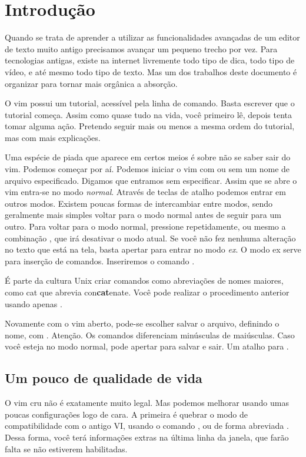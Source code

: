 \section{Introdução}
Quando se trata de aprender a utilizar as funcionalidades avançadas de um editor de texto muito
antigo precisamos avançar um pequeno trecho por vez.
Para tecnologias antigas, existe na internet livremente todo tipo de dica,
todo tipo de vídeo, e até mesmo todo tipo de texto.
Mas um dos trabalhos deste documento é organizar para tornar mais orgânica a absorção.

O vim possui um tutorial, acessível pela linha de comando.
Basta escrever  que o tutorial começa.
Assim como quase tudo na vida, você primeiro lê, depois tenta tomar alguma ação.
Pretendo seguir mais ou menos a mesma ordem do tutorial, mas com mais explicações.

Uma espécie de piada que aparece em certos meios é sobre não se saber sair do vim.
Podemos começar por aí.
Podemos iniciar o vim com ou sem um nome de arquivo especificado.
Digamos que entramos sem especificar.
Assim que se abre o vim entra-se no modo \emph{normal}.
Através de teclas de atalho podemos entrar em outros modos.
Existem poucas formas de intercambiar entre modos, sendo geralmente mais simples voltar
para o modo normal antes de seguir para um outro.
Para voltar para o modo normal, pressione  repetidamente,
ou mesmo a combinação , que irá desativar o modo atual.
Se você não fez nenhuma alteração no texto que está na tela, basta apertar \vimcommand{:} para entrar no modo \emph{ex}.
O modo ex serve para inserção de comandos.
Inseriremos o comando .

É parte da cultura Unix criar comandos como abreviações de nomes maiores,
como cat que abrevia con\textbf{cat}enate.
Você pode realizar o procedimento anterior usando apenas .

Novamente com o vim aberto, pode-se escolher salvar o arquivo, definindo o nome, com .
Atenção. Os comandos diferenciam minúsculas de maiúsculas.
Caso você esteja no modo normal, pode apertar  para salvar e sair. Um atalho para .

\subsection{Um pouco de qualidade de vida}
O vim cru não é exatamente muito legal.
Mas podemos melhorar usando umas poucas configurações logo de cara.
A primeira é quebrar o modo de compatibilidade com o antigo VI, usando o comando ,
ou de forma abreviada .
Dessa forma, você terá informações extras na última linha da janela, que farão falta se não estiverem habilitadas.

